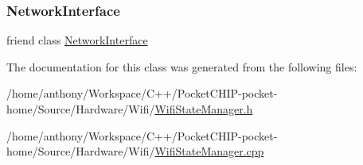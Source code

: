 \subsubsection{\texorpdfstring{Network\+Interface}{NetworkInterface}}
{\footnotesize\ttfamily friend class \mbox{\hyperlink{classWifiStateManager_1_1NetworkInterface}{Network\+Interface}}\hspace{0.3cm}{\ttfamily [friend]}}



The documentation for this class was generated from the following files\+:\begin{DoxyCompactItemize}
\item 
/home/anthony/\+Workspace/\+C++/\+Pocket\+C\+H\+I\+P-\/pocket-\/home/\+Source/\+Hardware/\+Wifi/\mbox{\hyperlink{WifiStateManager_8h}{Wifi\+State\+Manager.\+h}}\item 
/home/anthony/\+Workspace/\+C++/\+Pocket\+C\+H\+I\+P-\/pocket-\/home/\+Source/\+Hardware/\+Wifi/\mbox{\hyperlink{WifiStateManager_8cpp}{Wifi\+State\+Manager.\+cpp}}\end{DoxyCompactItemize}
